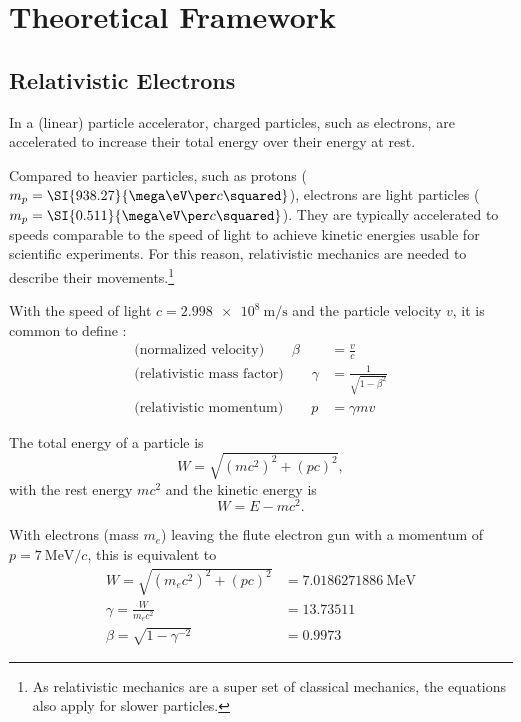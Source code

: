 \chapter{Theoretical Framework}
\section{Relativistic Electrons}
In a (linear) particle accelerator, charged particles, such as electrons, are accelerated to increase their total energy over their energy at rest.

Compared to heavier particles, such as protons ($m_p=\SI{938.27}{\mega\eV\per c\squared}$), electrons are light particles ($m_p=\SI{0.511}{\mega\eV\per c\squared}$). They are typically accelerated to speeds comparable to the speed of light to achieve kinetic energies usable for scientific experiments. For this reason, relativistic mechanics are needed to describe their movements.\footnote{As relativistic mechanics are a super set of classical mechanics, the equations also apply for slower particles.} \cite{Hinterberger1997}

With the speed of light $c=\SI{2.998e8}{\m\per\s}$ and the particle velocity $v$, it is common to define \cite{Wangler2008}:
\begin{align}\label{eq:theoreticalFramework_gammabeta}
\text{(normalized velocity)}\qquad\beta &= \frac{v}{c}\\
\text{(relativistic mass factor)}\qquad\gamma &= \frac{1}{\sqrt{1-\beta^2}} \\
\text{(relativistic momentum)}\qquad p &= \gamma m v 
\end{align}

The total energy of a particle is \cite{Hinterberger1997}
\begin{equation}
W=\sqrt{(mc^2)^2+(pc)^2},
\end{equation}
with the rest energy $mc^2$ and the kinetic energy is
\begin{equation}
W=E-mc^2.
\end{equation}

With electrons (mass $m_e$) leaving the \gls{flute} electron gun with a momentum of $p=\SI{7}{\MeV\per c}$, this is equivalent to
\begin{align}
W=\sqrt{(m_ec^2)^2+(pc)^2} &= \SI{7.0186271886}{\MeV}\\
\gamma = \frac{W}{m_ec^2} &= \num{13.73511}\\
\beta = \sqrt{1-\gamma^{-2}} &= 0.9973
\end{align}

